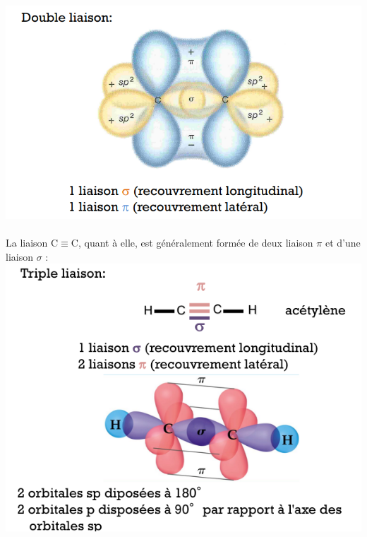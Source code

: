\documentclass{article}
\begin{document}
            \includegraphics[scale=.5]{liaison_double_c_c.png}\\\\
            La liaison C$\equiv$C, quant à elle, est généralement 
            formée de deux liaison $\pi$ et d'une liaison $\sigma$ : \\
            \includegraphics[scale=.5]{liaison_triple_c_c.png}

        
\end{document}
